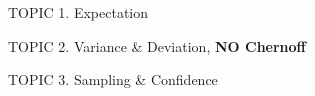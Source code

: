 \documentclass[handout]{mcs}
\begin{document}
\renewcommand{\reading}{
Chapter~\bref{deviation_chap}{Deviation}
}

\begin{staffnotes}
TOPIC 1.  Expectation

TOPIC 2.  Variance \& Deviation, \textbf{NO Chernoff}

TOPIC 3.  Sampling \& Confidence

\end{staffnotes}

\end{document}
